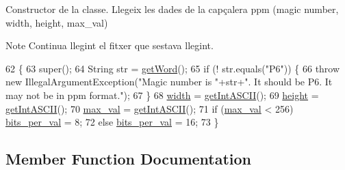 Constructor de la classe. Llegeix les dades de la capçalera ppm (magic number, width, height, max\+\_\+val) 

\begin{DoxyNote}{Note}
Continua llegint el fitxer que s\textquotesingle{}estava llegint. 
\end{DoxyNote}

\begin{DoxyCode}
62                             \{
63         super();
64         String str = \hyperlink{classpersistencia_1_1input_1_1Ctrl__Input__Img_a17676e8616da5821ca2323da4691d240}{getWord}();
65         \textcolor{keywordflow}{if} (! str.equals(\textcolor{stringliteral}{"P6"})) \{
66             \textcolor{keywordflow}{throw} \textcolor{keyword}{new} IllegalArgumentException(\textcolor{stringliteral}{"Magic number is "}+str+\textcolor{stringliteral}{". It should be P6. It may not be in
       ppm format."});
67         \}
68         \hyperlink{classpersistencia_1_1input_1_1Ctrl__Input__Img_a51dd0b9243b854aa25ac4532acca4524}{width} = \hyperlink{classpersistencia_1_1input_1_1Ctrl__Input__Img_a430158ff229038ddc3476d406239f4cd}{getIntASCII}();
69         \hyperlink{classpersistencia_1_1input_1_1Ctrl__Input__Img_abc1dcc48714e9e74fb8ae0e0b81f91bf}{height} = \hyperlink{classpersistencia_1_1input_1_1Ctrl__Input__Img_a430158ff229038ddc3476d406239f4cd}{getIntASCII}();
70         \hyperlink{classpersistencia_1_1input_1_1Ctrl__Input__Img_a1b8fa2d000a1d5d873be62d1f609e4be}{max\_val} = \hyperlink{classpersistencia_1_1input_1_1Ctrl__Input__Img_a430158ff229038ddc3476d406239f4cd}{getIntASCII}();
71         \textcolor{keywordflow}{if} (\hyperlink{classpersistencia_1_1input_1_1Ctrl__Input__Img_a1b8fa2d000a1d5d873be62d1f609e4be}{max\_val} < 256) \hyperlink{classpersistencia_1_1input_1_1Ctrl__Input__Img_a222ad0e7d241e5f396cf67c3b760f143}{bits\_per\_val} = 8;
72         \textcolor{keywordflow}{else}               \hyperlink{classpersistencia_1_1input_1_1Ctrl__Input__Img_a222ad0e7d241e5f396cf67c3b760f143}{bits\_per\_val} = 16;
73     \}
\end{DoxyCode}


\subsection{Member Function Documentation}
\mbox{\label{classpersistencia_1_1input_1_1Ctrl__Input__Img_ac549527b5947a7ec9f40d53e492f4ffa}} 
